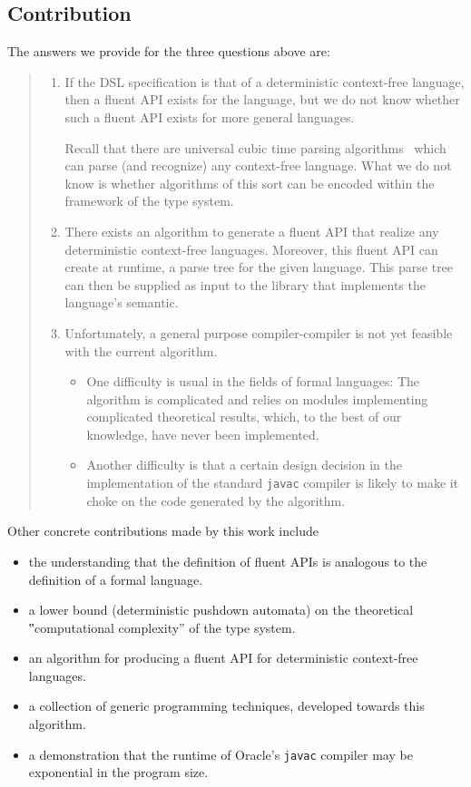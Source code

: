 \subsection{Contribution}
The answers we provide for the three questions above are:
\begin{quote}
  \begin{enumerate}
  \item If the DSL specification is that of a deterministic context-free
    language, then a fluent API exists for the language, but we do not know
    whether such a fluent API exists for more general languages.
  \par
  Recall that there are universal cubic time parsing
  algorithms~\cite{Cocke:1969,Earley:1970,Younger:1967} which can parse (and
  recognize) any context-free language. What we do not know is whether
  algorithms of this sort
  can be encoded within the framework of the \Java type system.
  \item
  There exists an algorithm to generate a fluent API that realize any
  deterministic context-free languages. Moreover, this fluent API can create
  at runtime, a parse tree for the given language. This parse tree can then be
  supplied as input to the library that implements the language's semantic.
  \item
  Unfortunately, a general purpose
  compiler-compiler is not yet feasible with the current algorithm.
  \begin{itemize}
    \item One difficulty is usual in the fields of formal languages:
      The algorithm is complicated and relies on
      modules implementing complicated theoretical results, which, to the best
      of our knowledge, have never been implemented.
    \item Another difficulty is that a certain design decision in the
      implementation of the standard \texttt{javac} compiler is likely to make
      it choke on the \Java code generated by the algorithm.
  \end{itemize}
  \end{enumerate}
\end{quote}

Other concrete contributions made by this work include
\begin{itemize}
  \item the understanding that the definition of fluent APIs is analogous to
      the definition of a formal language.
  \item a lower bound (deterministic pushdown automata)
    on the theoretical ‟computational complexity” of the \Java type system.
  \item an algorithm for producing a fluent API for deterministic context-free
    languages.
  \item a collection of generic programming techniques, developed towards this
    algorithm.
  \item a demonstration that the runtime of Oracle's \texttt{javac} compiler
    may be exponential in the program size.
\end{itemize}


